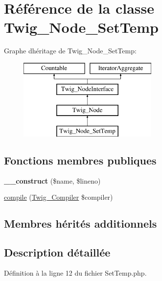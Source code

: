 \hypertarget{class_twig___node___set_temp}{}\section{Référence de la classe Twig\+\_\+\+Node\+\_\+\+Set\+Temp}
\label{class_twig___node___set_temp}
Graphe d\textquotesingle{}héritage de Twig\+\_\+\+Node\+\_\+\+Set\+Temp\+:\begin{figure}[H]
\begin{center}
\leavevmode
\includegraphics[height=4.000000cm]{class_twig___node___set_temp}
\end{center}
\end{figure}
\subsection*{Fonctions membres publiques}
\begin{DoxyCompactItemize}
\item 
{\bfseries \+\_\+\+\_\+construct} (\$name, \$lineno)\hypertarget{class_twig___node___set_temp_ae217ce26c809152fd385490096a36b75}{}\label{class_twig___node___set_temp_ae217ce26c809152fd385490096a36b75}

\item 
\hyperlink{class_twig___node___set_temp_a4e0faa87c3fae583620b84d3607085da}{compile} (\hyperlink{class_twig___compiler}{Twig\+\_\+\+Compiler} \$compiler)
\end{DoxyCompactItemize}
\subsection*{Membres hérités additionnels}


\subsection{Description détaillée}


Définition à la ligne 12 du fichier Set\+Temp.\+php.




